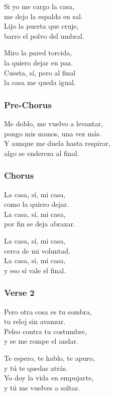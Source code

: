 Si yo me cargo la casa,\\
me dejo la espalda en sal.\\
Lijo la puerta que cruje,\\
barro el polvo del umbral.

Miro la pared torcida,\\
la quiero dejar en paz.\\
Cuesta, sí, pero al final\\
la casa me queda igual.

\subsubsection{Pre-Chorus}\label{pre-chorus-35}

Me doblo, me vuelvo a levantar,\\
pongo mis manos, una vez más.\\
Y aunque me duela hasta respirar,\\
algo se endereza al final.

\subsubsection{Chorus}\label{chorus-55}

La casa, sí, mi casa,\\
como la quiero dejar.\\
La casa, sí, mi casa,\\
por fin se deja abrazar.

La casa, sí, mi casa,\\
cerca de mi voluntad.\\
La casa, sí, mi casa,\\
y eso sí vale el final.

\subsubsection{Verse 2}\label{verse-2-22}

Pero otra cosa es tu sombra,\\
tu reloj sin avanzar.\\
Peleo contra tu costumbre,\\
y se me rompe el andar.

Te espero, te hablo, te apuro,\\
y tú te quedas atrás.\\
Yo doy la vida en empujarte,\\
y tú me vuelves a soltar.

